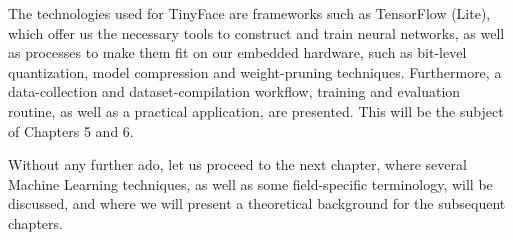 The technologies used for TinyFace are frameworks such as TensorFlow (Lite), which offer us the necessary tools to construct and train neural networks, as well as processes to make them fit on our embedded hardware, such as bit-level quantization, model compression and weight-pruning techniques. Furthermore, a data-collection and dataset-compilation workflow, training and evaluation routine, as well as a practical application, are presented. This will be the subject of Chapters 5 and 6. \par
Without any further ado, let us proceed to the next chapter, where several Machine Learning techniques, as well as some field-specific terminology, will be discussed, and where we will present a theoretical background for the subsequent chapters.